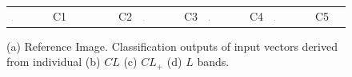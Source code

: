 \begin{figure}[tp]
\begin{subfigure}[b]{0.35\textwidth}
		\caption{}
		\label{fig:P}
	\end{subfigure}
	\begin{tabular}{lllllllllll}
		\includegraphics[width=0.01\textwidth]{Figures/Kron/Legend/Pea} & C1 & \includegraphics[width=0.01\textwidth]{Figures/Kron/Legend/Wheat} & C2 & \includegraphics[width=0.01\textwidth]{Figures/Kron/Legend/Rseed} & C3 & \includegraphics[width=0.01\textwidth]{Figures/Kron/Legend/Luc} & C4 &
		\includegraphics[width=0.01\textwidth]{Figures/Kron/Legend/Barley} & C5 &
	\end{tabular}
	\caption{(a) Reference Image.  Classification outputs of input vectors derived from individual (b) $CL$ (c) $CL_+$ (d) $L$ bands. }\label{fig:secondSet}
\end{figure}






































